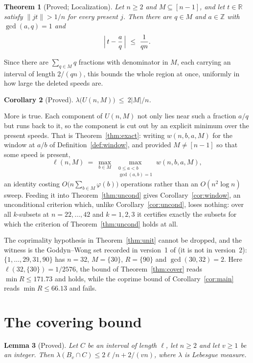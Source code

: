 \documentclass[11pt]{amsart}
\theoremstyle{plain}
\newtheorem{theorem}{Theorem}[section]
\newtheorem{lemma}[theorem]{Lemma}
\newtheorem{corollary}[theorem]{Corollary}
\theoremstyle{definition}
\newcommand{\nrm}[1]{\left\lVert #1 \right\rVert}
\newcommand{\Z}{\mathbb{Z}}
\newcommand{\R}{\mathbb{R}}
\begin{document}
\begin{theorem}[Proved; Localization]\label{thm:localize}
Let $n\ge2$ and $M\subseteq[n-1]$, and let $t\in\R$ satisfy $\nrm{jt}>1/n$ for every present $j$.
Then there are $q\in M$ and $a\in\Z$ with $\gcd(a,q)=1$ and
\[
  \Bigl|\,t-\frac aq\,\Bigr|\ \le\ \frac1{qn}.
\]
\end{theorem}

Since there are $\sum_{q\in M}q$ fractions with denominator in $M$, each carrying an interval of
length $2/(qn)$, this bounds the whole region at once, uniformly in how large the deleted speeds
are.

\begin{corollary}[Proved]\label{cor:measure}
$\lambda\bigl(U(n,M)\bigr)\ \le\ 2|M|/n$.
\end{corollary}

More is true. Each component of $U(n,M)$ not only lies near such a fraction $a/q$ but runs back to
it, so the component is cut out by an explicit minimum over the present speeds. That is
Theorem~\ref{thm:exact}: writing $w(n,b,a,M)$ for the window at $a/b$ of
Definition~\ref{def:window}, and provided $M\ne[n-1]$ so that some speed is present,
\[
  \ell(n,M)\ =\ \max_{b\in M}\ \max_{\substack{0\le a<b\\ \gcd(a,b)=1}} w(n,b,a,M),
\]
an identity costing $O\bigl(n\sum_{b\in M}\varphi(b)\bigr)$ operations rather than an
$O(n^{2}\log n)$ sweep. Feeding it into
Theorem~\ref{thm:uncond} gives Corollary~\ref{cor:window}, an unconditional criterion which, unlike
Corollary~\ref{cor:uncond}, loses nothing: over all $k$-subsets at $n=22,\dots,42$ and $k=1,2,3$ it
certifies exactly the subsets for which the criterion of Theorem~\ref{thm:uncond} holds at all.

The coprimality hypothesis in Theorem~\ref{thm:unit} cannot be dropped, and the witness is the
Goddyn--Wong set recorded in version~1 of \cite{zhang} (it is not in version~2): $\{1,\dots,29,31,90\}$ has $n=32$,
$M=\{30\}$, $R=\{90\}$ and $\gcd(30,32)=2$. Here $\ell(32,\{30\})=1/2576$, the bound of
Theorem~\ref{thm:cover} reads $\min R\le 171.73$ and holds, while the coprime bound of
Corollary~\ref{cor:main} reads $\min R\le 66.13$ and fails.

\section{The covering bound}

\begin{lemma}[Proved]\label{lem:strip}
Let $C$ be an interval of length $\ell$, let $n\ge2$ and let $v\ge1$ be an integer. Then
$\lambda(B_v\cap C)\le 2\ell/n+2/(vn)$, where $\lambda$ is Lebesgue measure.
\end{lemma}
\end{document}
